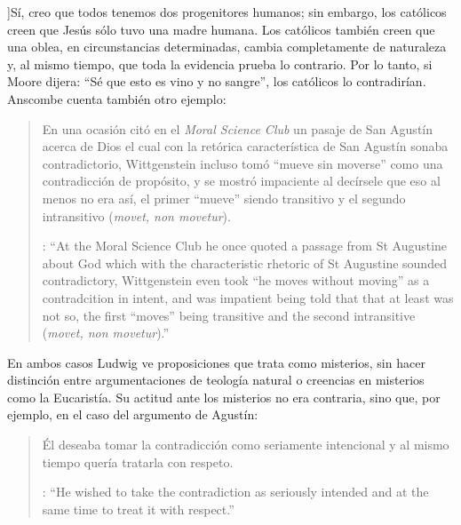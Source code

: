 ]{Sí, creo que todos tenemos dos progenitores humanos; sin embargo, los católicos creen que Jesús sólo tuvo una madre humana. \textelp{} Los católicos también creen que una oblea, en circunstancias determinadas, cambia completamente de naturaleza y, al mismo tiempo, que toda la evidencia prueba lo contrario. Por lo tanto, si Moore dijera: ``Sé que esto es vino y no sangre'', los católicos lo contradirían}. Anscombe cuenta también otro ejemplo:\blockquote[{\cite[122]{anscombe1981parmenides:qli}}: \enquote{At the Moral Science Club he once quoted a passage from St Augustine about God which with the characteristic rhetoric of St Augustine sounded contradictory, Wittgenstein even took ``he moves without moving'' as a contradcition in intent, and was impatient being told that that at least was not so, the first ``moves'' being transitive and the second intransitive (\emph{movet, non movetur}).}]{En una ocasión citó en el \emph{Moral Science Club} un pasaje de San Agustín acerca de Dios el cual con la retórica característica de San Agustín sonaba contradictorio, Wittgenstein incluso tomó ``mueve sin moverse'' como una contradicción de propósito, y se mostró impaciente al decírsele que eso al menos no era así, el primer ``mueve'' siendo transitivo y el segundo intransitivo (\emph{movet, non movetur}).} En ambos casos Ludwig ve proposiciones que trata como misterios, sin hacer distinción entre argumentaciones de teología natural o creencias en misterios como la Eucaristía. Su actitud ante los misterios no era contraria, sino que, por ejemplo, en el caso del argumento de Agustín: \blockquote[{\cite[122]{anscombe1981parmenides:qli}}: \enquote{He wished to take the contradiction as seriously intended and at the same time to treat it with respect.}]{Él deseaba tomar la contradicción como seriamente intencional y al mismo tiempo quería tratarla con respeto.}

